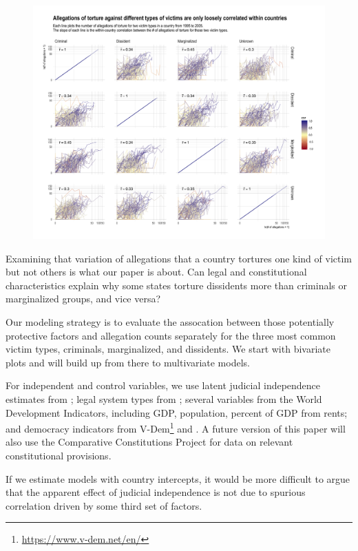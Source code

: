 \documentclass[12pt]{article}
\begin{document}
\begin{figure}
\begin{center}
\caption{}
\label{fig:correlation-matrix}
\includegraphics[width=.99\textwidth]{../output/allegations-by-victim-scatterplots.png}
\end{center}
\end{figure}

Examining that variation of allegations that a country tortures one kind of victim but not others is what our paper is about. Can legal and constitutional characteristics explain why some states torture dissidents more than criminals or marginalized groups, and vice versa?

Our modeling strategy is to evaluate the assocation between those potentially protective factors and allegation counts separately for the three most common victim types, criminals, marginalized, and dissidents. We start with bivariate plots and will build up from there to multivariate models. 

For independent and control variables, we use latent judicial independence estimates from \citet{linzer2015global}; legal system types from \citet{mitchell2013domestic}; several variables from the World Development Indicators, including GDP, population, percent of GDP from rents; and democracy indicators from V-Dem\footnote{\url{https://www.v-dem.net/en/}} and \citet{cheibub2010democracy}. A future version of this paper will also use the Comparative Constitutions Project for data on relevant constitutional provisions. 

If we estimate models with country intercepts, it would be more difficult to argue that the apparent effect of judicial independence is not due to spurious correlation driven by some third set of factors. 
\end{document}
